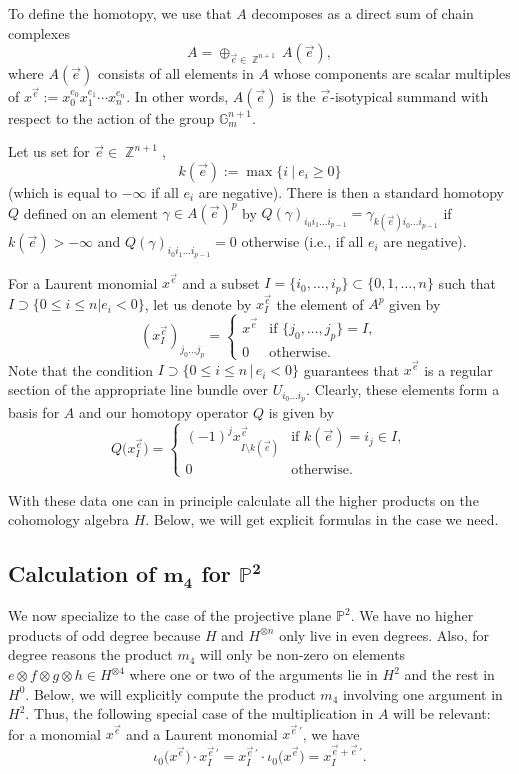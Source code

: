 \documentclass[10pt,a4paper]{amsart}
\numberwithin{equation}{section}
\DeclareMathOperator\Z{\mathbb Z}
\renewcommand{\P}{{\mathbb P}}
\newcommand{\G}{{\mathbb G}}
\begin{document}
To define the homotopy, we use that $A$ decomposes as a direct sum of chain complexes
\[
A=\oplus_{\vec{e}\in \Z^{n+1}}A(\vec{e}),
\]
where $A(\vec{e})$ consists of all elements
 in $A$ whose components are scalar multiples of $x^{\vec{e}}:=x_0^{e_0}x_1^{e_1}\cdots x_n^{e_n}$. In other words,
 $A(\vec{e})$ is the $\vec{e}$-isotypical summand with respect to the action of the group $\G_m^{n+1}$.

 Let us set for $\vec{e}\in\Z^{n+1}$,
 \[k(\vec{e}):=\max\{i \ |\ e_i\geq 0\}\]
(which is equal to $-\infty$ if all $e_i$ are negative).
 There is then a standard homotopy $Q$ defined on an element $\gamma\in A(\vec{e})^{p}$ by
$Q(\gamma)_{i_0i_1\dots  i_{p-1}}=\gamma_{k(\vec{e})i_0\dots i_{p-1}}$ if $k(\vec{e})>-\infty$
 and $Q(\gamma)_{i_0i_1\dots  i_{p-1}}=0$ otherwise (i.e., if all $e_i$ are negative).

 For a Laurent monomial $x^{\vec{e}}$ and a subset
 $I=\{i_0,\dots ,i_p\}\subset \{0,1,\dots ,n\}$ such that $I\supset \{0\leq i\leq n|e_i<0\}$, let us denote
 by $x^{\vec{e}}_I$ the element of $A^p$ given by
 \[
 (x^{\vec{e}}_I)_{j_0\ldots j_p}=\begin{cases}
	x^{\vec{e}} & \text{if } \{j_0,\dots ,j_p\}=I,\\ 0 &\text{otherwise}.\end{cases}
\]
	Note that the condition $I\supset \{0\leq i\leq n \, |\, e_i<0\}$ guarantees that $x^{\vec{e}}$ is a regular section of the appropriate line bundle over $U_{i_0\ldots i_p}$.
	Clearly, these elements form a basis for $A$ and our homotopy operator $Q$ is given by
	\[
Q\big(x^{\vec{e}}_I\big)=\begin{cases}
		(-1)^jx^{\vec{e}}_{I\setminus k(\vec{e})} & \text{if }k(\vec{e})=i_j\in I,\\
		0 & \text{otherwise}.
	\end{cases}
\]

With these data one can in principle calculate all the higher products on the cohomology algebra $H$. Below, we will get explicit formulas in the case we need.

\subsection[Calculation of m\_4 for P\^{}2]{Calculation of $\boldsymbol{m_4}$ for $\boldsymbol{\P^2}$}\label{m4-P2-calc-sec}

We now specialize to the case of the projective plane $\mathbb{P}^2$. We have no higher products of odd degree because $H$ and $H^{\otimes n}$ only live in even degrees.
Also, for degree reasons the product $m_4$ will only be non-zero on elements $e\otimes f\otimes g\otimes h\in H^{\otimes 4}$ where one or two of the arguments lie in $H^2$ and the rest in $H^0$. Below, we will explicitly compute the product $m_4$ involving one argument in $H^2$.
Thus, the following special case of the multiplication in $A$ will be relevant: for a monomial $x^{\vec{e}}$ and a Laurent monomial $x^{\vec{e}\,'}$, we have
\[
\iota_0\big(x^{\vec{e}}\big)\cdot x^{\vec{e}\,'}_I=x^{\vec{e}\,'}_I\cdot \iota_0\big(x^{\vec{e}}\big)=x^{\vec{e}+\vec{e}\,'}_I.
\]
\end{document}
